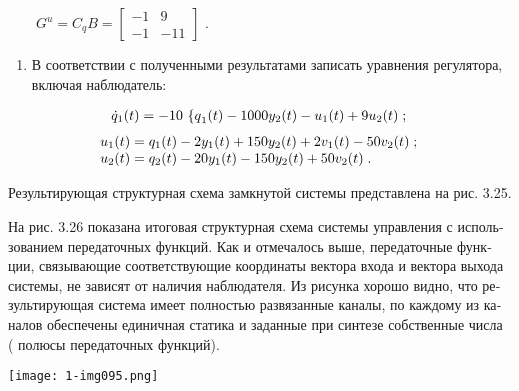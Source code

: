 \documentclass[a4paper]{article}
\newcommand\liststyleWWviiiNumlxi{%
\renewcommand\theenumi{\arabic{enumi}}
\renewcommand\theenumii{\alph{enumii}}
\renewcommand\theenumiii{\roman{enumiii}}
\renewcommand\theenumiv{\arabic{enumiv}}
\renewcommand\labelenumi{\theenumi.}
\renewcommand\labelenumii{\theenumii.}
\renewcommand\labelenumiii{\theenumiii.}
\renewcommand\labelenumiv{\theenumiv.}
}
\newcommand\normalsubformula[1]{\text{\mathversion{normal}$#1$}}
\begin{document}
{\begin{russian}\sffamily
\textenglish{\ \ }\ \  $G^u=C_qB=\left[\begin{matrix}-1&9\\-1&-11\end{matrix}\right]$ .
\end{russian}}

\liststyleWWviiiNumlxi
\begin{enumerate}
\item {\begin{russian}\sffamily
В соответствии с полученными результатами записать уравнения регулятора, включая наблюдатель:
\end{russian}}
\end{enumerate}
\begin{equation*}
\begin{matrix}\dot q_1(t)=-\text{10 \{}\normalsubformula q_1(t)-1000y_2(t)-u_1(t)+9u_2(t)\;;\hfill\null
\end{matrix}\hfill 
\end{equation*}
\begin{equation*}
\begin{matrix}u_1(t)=q_1(t)-2y_1(t)+150y_2(t)+2v_1(t)-50v_2(t)\;;\hfill\null
\\u_2(t)=q_2(t)-20y_1(t)-150y_2(t)+50v_2(t)\;.\hfill\null \end{matrix}\hfill 
\end{equation*}
{\begin{russian}\sffamily
Результирующая структурная схема замкнутой системы представлена на рис. 3.25. 
\end{russian}}

{\begin{russian}\sffamily
На рис. 3.26 показана итоговая структурная схема системы управления с использованием передаточных функций. Как и
отмечалось выше, передаточные функции, связывающие соответствующие координаты вектора входа и вектора выхода системы,
не зависят от наличия наблюдателя. Из рисунка хорошо видно, что результирующая система имеет полностью развязанные
каналы, по каждому из каналов обеспечены единичная статика и заданные при синтезе собственные числа ( полюсы
передаточных функций).
\end{russian}}


\bigskip

 \texttt{[image: 1-img095.png]} 


\bigskip


\bigskip
\end{document}
